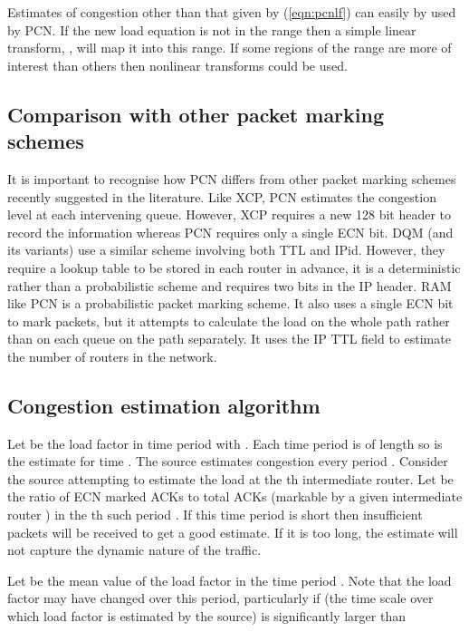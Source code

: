 Estimates of congestion other than that given by (\ref{eqn:pcnlf}) can
easily by used by PCN.  If the new load equation is
not in the range  then a simple linear transform, ,
will map
it into this range.  If some regions of the range are more of interest
than others then nonlinear transforms could be used.

\subsection{Comparison with other packet marking schemes}
\label{sec:comparison}

It is important to recognise how PCN differs from other packet marking
schemes recently suggested in the literature.
Like XCP, PCN estimates the congestion level at each intervening
queue.  However,
XCP requires a new 128 bit header to record the information whereas
PCN requires
only a single ECN bit. DQM (and its variants) use a similar scheme
involving
both TTL and IPid.
However, they require
a lookup table to be stored in each router in advance, it
is a deterministic rather than a probabilistic scheme and requires two
bits in the IP
header. RAM like PCN is a probabilistic packet marking scheme. It also
uses a single ECN bit to mark packets, but it attempts to calculate
the load on the whole path rather than on each queue on the path
separately. It uses the IP TTL field to estimate the number of routers
in the network.


\subsection{Congestion estimation algorithm}
\label{sec:prediction}

Let  be the load factor in time period
 with
.  Each time period is of length 
so   is the estimate for time .
The source estimates congestion every period .
Consider the source attempting to estimate the load at the th
intermediate router.
Let  be the ratio of ECN marked ACKs to total
ACKs (markable by a given intermediate router ) in the th such
period
.  If this time period is
short then insufficient packets will be received to get a good
estimate.
If it is too long, the estimate will not capture the
dynamic nature of the traffic.

Let  be the mean value of the load factor  in the time
period
.  Note that the load factor may have changed over
this period, particularly if  (the time scale over which load
factor is estimated by the source) is significantly larger than

